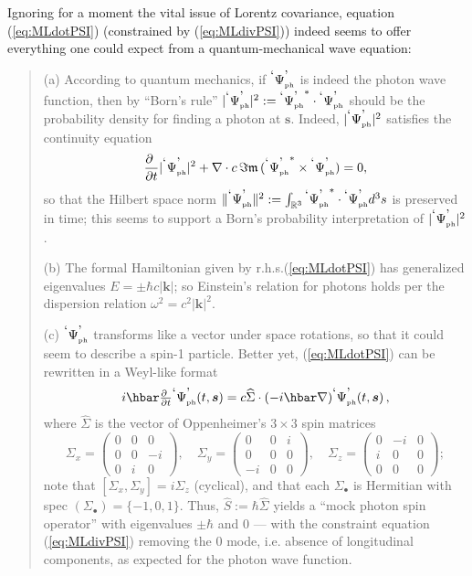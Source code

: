 \documentclass[11pt]{article}
\theoremstyle{definition}
\newcommand{\pddt}{\frac{\partial\phantom{t}}{\partial t}}
\newcommand{\refeq}[1]{(\ref{#1})}
\newcommand{\vect}[1] {\boldsymbol{{ #1}} }
\newcommand{\kV}{{\vect{k}}}		%
\newcommand{\sV}{{\vect{s}}}            %
\numberwithin{equation}{section}
\newcommand{\fm}{\mathfrak{m}}
\newcommand{\PsiPh}{{}^{\mbox{\textrm{`}}}{\Psi_{\mbox{\rm\tiny ph}}^{\mbox{\textrm{'}}}}}
\newcommand{\Rset}{{\mathbb R}}
\newcommand{\Si}{\Sigma}
\newcommand{\nab}{\nabla}
\begin{document}
 Ignoring for a moment the vital issue of Lorentz covariance, equation \refeq{eq:MLdotPSI} (constrained by \refeq{eq:MLdivPSI}) indeed
seems to offer everything one could expect from a quantum-mechanical wave equation:
\begin{quotation}
\noindent
 (a)  According to quantum mechanics, if $\PsiPh$ is indeed the photon wave function, then by ``Born's rule'' 
$|\PsiPh|^2  := \PsiPh^*\cdot\PsiPh$ should be the probability density for finding a photon at $\sV$. 
 Indeed, $|\PsiPh|^2$ satisfies the continuity equation
\begin{equation}
\pddt |\PsiPh|^2 + \nabla\cdot c\,\Im\fm\, (\PsiPh^*\times\PsiPh) = 0,
\end{equation}
so that the Hilbert space norm $\|\PsiPh\|^2:= \int_{\Rset^3}\PsiPh^*\cdot\PsiPh d^3s$ is preserved in time; this seems to support
a Born's probability interpretation of $|\PsiPh|^2$.
\smallskip

\noindent
 (b) The formal Hamiltonian given by r.h.s.\refeq{eq:MLdotPSI} has generalized eigenvalues $E = \pm \hbar c|\kV|$; so Einstein's 
relation for photons holds per the dispersion relation $\omega^2 = c^2|\kV|^2$.
\smallskip

\noindent
 (c) $\PsiPh$ transforms like a vector under space rotations, so that it could seem to describe a spin-1 particle.
    Better yet, \refeq{eq:MLdotPSI} can be rewritten in a Weyl-like format 
\begin{equation}
 i \hbar \textstyle{\pddt}{\PsiPh}(t,\sV)
= \label{eq:MLdotPSIinWEYLshape}
         c \widehat{\Sigma}\cdot (-i\hbar\nab){\PsiPh}(t,\sV) \, ,
\end{equation}
where $\widehat{\Si}$ is the vector of Oppenheimer's $3\times3$ spin matrices 
\begin{equation}
\Sigma_x = 
\begin{pmatrix}  0 &  0 & 0 \\ 
                 0 &  0 & -i\\ 
                 0 &  i & 0 
\end{pmatrix},\quad 
\Sigma_y = 
\begin{pmatrix}  0 &  0 & i\\ 
                 0 &  0 & 0 \\ 
                -i &  0 & 0 
\end{pmatrix},\quad
\Sigma_z = 
\begin{pmatrix} 0 & -i & 0 \\ 
                i &  0 & 0 \\ 
                0 &  0 & 0 
\end{pmatrix};
\end{equation}
note that $[\Sigma_x,\Sigma_y]=i\Sigma_z$ (cyclical), and that each $\Sigma_\bullet^{}$ is Hermitian with spec $(\Sigma_\bullet^{})=\{-1,0,1\}$. 
 Thus, $\widehat{S}:=\hbar\widehat{\Sigma}$ yields a ``mock photon spin operator'' with eigenvalues $\pm\hbar$ and $0$ --- with 
the constraint equation \refeq{eq:MLdivPSI} removing the $0$ mode, i.e. absence of longitudinal components, as expected for the photon 
wave function.
\end{quotation}
\end{document}
